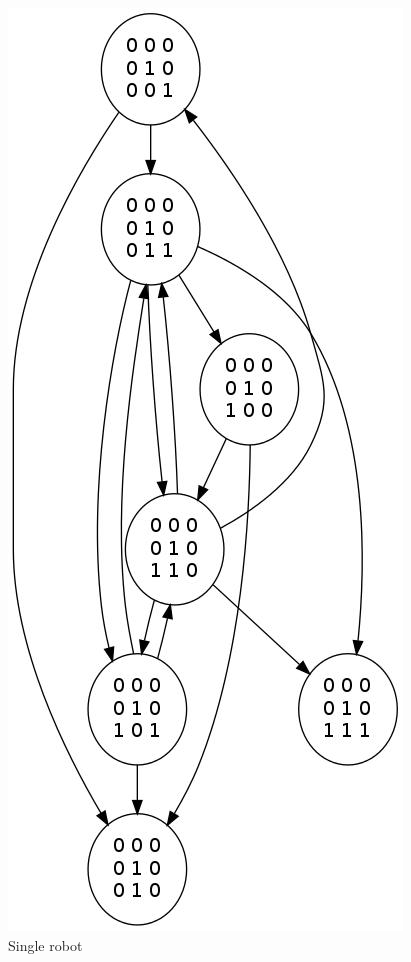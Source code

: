 \documentclass[11pt, a4paper]{article}
\theoremstyle{plain}
\theoremstyle{definition}
\theoremstyle{remark}
\begin{document}
\begin{figure}
\includegraphics[scale=0.50]{graph_images/graph_single_all.jpg}
\caption{Single robot}
\label{graph:single}
\end{figure}

\end{document}
